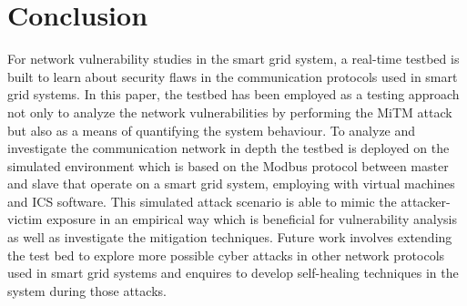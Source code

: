 \documentclass[letterpaper,10pt,conference]{IEEEtran}
\begin{document}
\section{Conclusion}
For network vulnerability studies in the smart grid system, a real-time testbed is built to learn about security flaws in the communication protocols used in smart grid systems. In this paper, the testbed has been employed as a testing approach not only to analyze the network vulnerabilities by performing the MiTM attack but also as a means of quantifying the system behaviour. To analyze and investigate the communication network in depth the testbed is deployed on the simulated environment which is based on the Modbus protocol between master and slave that operate on a smart grid system, employing with virtual machines and ICS software. This simulated attack scenario is able to mimic the attacker-victim exposure in an empirical way which is beneficial for vulnerability analysis as well as investigate the mitigation techniques. Future work involves extending the test bed to
explore more possible cyber attacks in other network protocols used in smart grid systems and enquires to develop self-healing techniques in the system during those attacks. 
\end{document}
